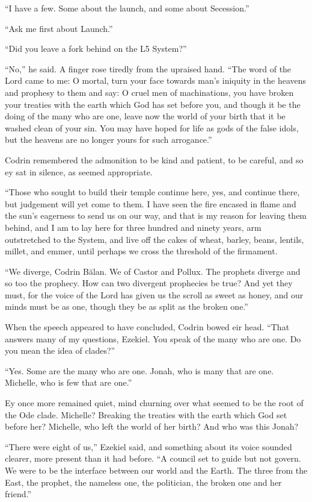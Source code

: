 ``I have a few. Some about the launch, and some about Secession.''

``Ask me first about Launch.''

``Did you leave a fork behind on the L5 System?''

``No,'' he said. A finger rose tiredly from the upraised hand. ``The word of the Lord came to me: O mortal, turn your face towards man's iniquity in the heavens and prophesy to them and say: O cruel men of machinations, you have broken your treaties with the earth which God has set before you, and though it be the doing of the many who are one, leave now the world of your birth that it be washed clean of your sin. You may have hoped for life as gods of the false idols, but the heavens are no longer yours for such arrogance.''

Codrin remembered the admonition to be kind and patient, to be careful, and so ey sat in silence, as seemed appropriate.

``Those who sought to build their temple continue here, yes, and continue there, but judgement will yet come to them. I have seen the fire encased in flame and the sun's eagerness to send us on our way, and that is my reason for leaving them behind, and I am to lay here for three hundred and ninety years, arm outstretched to the System, and live off the cakes of wheat, barley, beans, lentils, millet, and emmer, until perhaps we cross the threshold of the firmament.

``We diverge, Codrin Bălan. We of Castor and Pollux. The prophets diverge and so too the prophecy. How can two divergent prophecies be true? And yet they must, for the voice of the Lord has given us the scroll as sweet as honey, and our minds must be as one, though they be as split as the broken one.''

When the speech appeared to have concluded, Codrin bowed eir head. ``That answers many of my questions, Ezekiel. You speak of the many who are one. Do you mean the idea of clades?''

``Yes. Some are the many who are one. Jonah, who is many that are one. Michelle, who is few that are one.''

Ey once more remained quiet, mind churning over what seemed to be the root of the Ode clade. Michelle? Breaking the treaties with the earth which God set before her? Michelle, who left the world of her birth? And who was this Jonah?

``There were eight of us,'' Ezekiel said, and something about its voice sounded clearer, more present than it had before. ``A council set to guide but not govern. We were to be the interface between our world and the Earth. The three from the East, the prophet, the nameless one, the politician, the broken one and her friend.''

